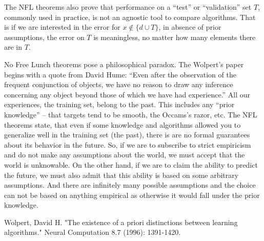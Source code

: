 \documentclass[a4paper]{article}
\begin{document}
The NFL theorems also prove that performance on a ``test'' or
``validation'' set $T$, commonly used in practice, is not an agnostic
tool to compare algorithms. That is if we are interested in the error
for $x\notin \{d \cup T\}$, in absence of prior assumptions, the error
on $T$ is meaningless, no matter how many elements there are in $T$.

No Free Lunch theorems pose a philosophical paradox. The Wolpert's
paper begins with a quote from David Hume: ``Even after the
observation of the frequent conjunction of objects, we have no reason
to draw any inference concerning any object beyond those of which we
have had experience.'' All our experiences, the training set, belong
to the past. This includes any ``prior knowledge'' -- that targets
tend to be smooth, the Occams's razor, etc. The NFL theorems state,
that even if some knowledge and algorithms allowed you to generalize
well in the training set (the past), there is are no formal guarantees
about its behavior in the future. So, if we are to subscribe to strict
empiricism and do not make any assumptions about the world, we must
accept that the world is unknowable. On the other hand, if we are to
claim the ability to predict the future, we must also admit that this
ability is based on some arbitrary assumptions. And there are
infinitely many possible assumptions and the choice can not be based
on anything empirical as otherwise it would fall under the prior
knowledge.


\begin{thebibliography}{99}
 Wolpert, David H. "The existence of a
  priori distinctions between learning algorithms." Neural Computation
  8.7 (1996): 1391-1420.
\end{thebibliography}
\end{document}
